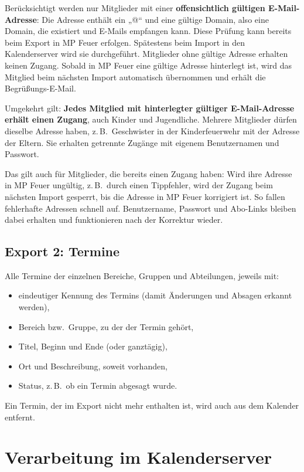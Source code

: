 \documentclass[a4paper,fontsize=10pt]{scrartcl}
\begin{document}
Berücksichtigt werden nur Mitglieder mit einer \textbf{offensichtlich gültigen
E-Mail-Adresse}: Die Adresse enthält ein „@“ und eine gültige Domain, also eine
Domain, die existiert und E-Mails empfangen kann. Diese Prüfung kann bereits
beim Export in MP Feuer erfolgen. Spätestens beim Import in den
Kalenderserver wird sie durchgeführt. Mitglieder ohne gültige Adresse erhalten
keinen Zugang. Sobald in MP Feuer eine gültige Adresse hinterlegt ist, wird
das Mitglied beim nächsten Import automatisch übernommen und erhält die
Begrüßungs-E-Mail.

Umgekehrt gilt: \textbf{Jedes Mitglied mit hinterlegter gültiger
E-Mail-Adresse erhält einen Zugang}, auch Kinder und Jugendliche. Mehrere
Mitglieder dürfen dieselbe Adresse haben, z.\,B.\ Geschwister in der
Kinderfeuerwehr mit der Adresse der Eltern. Sie erhalten getrennte Zugänge mit
eigenem Benutzernamen und Passwort.

Das gilt auch für Mitglieder, die bereits einen Zugang haben: Wird ihre Adresse
in MP Feuer ungültig, z.\,B.\ durch einen Tippfehler, wird der Zugang beim
nächsten Import gesperrt, bis die Adresse in MP Feuer korrigiert ist. So fallen
fehlerhafte Adressen schnell auf. Benutzername, Passwort und Abo-Links bleiben
dabei erhalten und funktionieren nach der Korrektur wieder.

\subsection*{Export 2: Termine}

Alle Termine der einzelnen Bereiche, Gruppen und Abteilungen, jeweils mit:
\begin{itemize}
  \item eindeutiger Kennung des Termins (damit Änderungen und Absagen
        erkannt werden),
  \item Bereich bzw.\ Gruppe, zu der der Termin gehört,
  \item Titel, Beginn und Ende (oder ganztägig),
  \item Ort und Beschreibung, soweit vorhanden,
  \item Status, z.\,B.\ ob ein Termin abgesagt wurde.
\end{itemize}

Ein Termin, der im Export nicht mehr enthalten ist, wird auch aus dem
Kalender entfernt.

\section{Verarbeitung im Kalenderserver}
\end{document}
